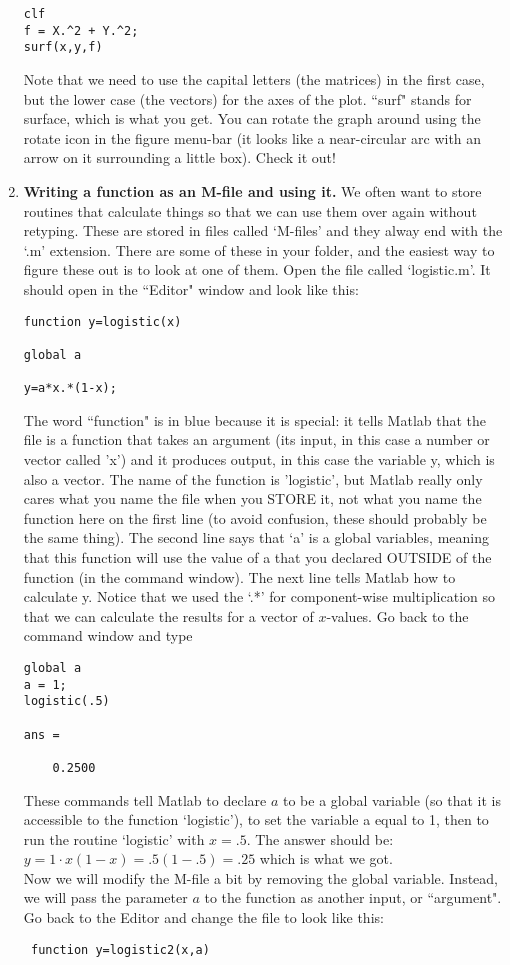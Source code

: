 \documentclass[12pt]{report}
\begin{document}
\begin{enumerate}
\begin{verbatim}
clf
f = X.^2 + Y.^2;
surf(x,y,f)
\end{verbatim}
Note that we need to use the capital letters (the matrices) in the first case, but the lower case (the vectors) for the axes of the plot.  ``surf" stands for surface, which is what you get.  You can rotate the graph around using the rotate icon in the figure menu-bar (it looks like a near-circular arc with an arrow on it surrounding a little box).  Check it out!
\item	{\bf Writing a function as an M-file and using it.}
We often want to store routines that calculate things so that we can use them over again without retyping.  These are stored in files called `M-files' and they alway end with the `.m' extension.  There are some of these in your folder, and the easiest way to figure these out is to look at one of them.  Open the file called `logistic.m'.  It should open in the ``Editor" window and look like this:
\begin{verbatim}
function y=logistic(x)

global a

y=a*x.*(1-x);
\end{verbatim}
The word ``function" is in blue because it is special: it tells Matlab that the file is a function that takes an argument (its input, in this case a number or vector called 'x') and it produces output, in this case the variable y, which is also a vector.  The name of the function is 'logistic', but Matlab really only cares what you name the file when you STORE it, not what you name the function here on the first line (to avoid confusion, these should probably be the same thing).   The second line says that `a' is a global variables, meaning that this function will use the value of a that you declared OUTSIDE of the function (in the command window).  The next line tells Matlab how to calculate y.  Notice that we used the `.*' for component-wise multiplication so that we can calculate the results for a vector of $x$-values.  Go back to the command window and type
\begin{verbatim}
global a
a = 1;
logistic(.5)

ans =

    0.2500
    \end{verbatim}
    These commands tell Matlab to declare $a$ to be a global variable (so that it is accessible to the function `logistic'), to set the variable a equal to 1, then to run the routine `logistic' with $x = .5$.  The answer should be:
    $y = 1 \cdot x (1 - x ) = .5 (1 - .5) = .25$ which is what we got.
   \\
   Now we will modify the M-file a bit by removing the global variable.  Instead, we will pass the parameter $a$ to the function as another input, or ``argument".   Go back to the Editor and change the file to look like this:
   \begin{verbatim}
 function y=logistic2(x,a)


\end{verbatim}
\end{enumerate}
\end{document}
